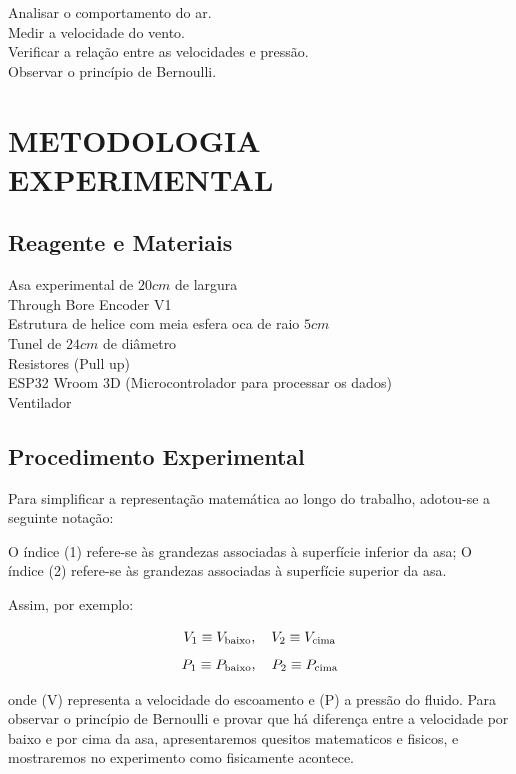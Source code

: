 \documentclass[12pt]{article}
\begin{document}
Analisar o comportamento do ar.\\
Medir a velocidade do vento.\\
Verificar a relação entre as velocidades e pressão.\\
Observar o princípio de Bernoulli.

\section{METODOLOGIA EXPERIMENTAL}

\subsection{Reagente e Materiais}

Asa experimental de $20cm$ de largura\\
Through Bore Encoder V1\\
Estrutura de helice com meia esfera oca de raio $5cm$\\
Tunel de $24cm$ de diâmetro\\
Resistores (Pull up)\\
ESP32 Wroom 3D (Microcontrolador para processar os dados) \\
Ventilador


\subsection{Procedimento Experimental}
Para simplificar a representação matemática ao longo do trabalho, adotou-se a seguinte notação:

O índice (1) refere-se às grandezas associadas à superfície inferior da asa;
O índice (2) refere-se às grandezas associadas à superfície superior da asa.

Assim, por exemplo:

\begin{equation}
V_1 \equiv V_{\text{baixo}}, \quad V_2 \equiv V_{\text{cima}} \\
\end{equation}
\begin{equation}
P_1 \equiv P_{\text{baixo}}, \quad P_2 \equiv P_{\text{cima}} \\ 
\end{equation}

onde (V) representa a velocidade do escoamento e (P) a pressão do fluido.
Para observar o princípio de Bernoulli e provar que há diferença entre a velocidade por baixo e por cima da asa, apresentaremos quesitos matematicos e fisicos, e mostraremos no experimento como fisicamente acontece.
\end{document}
